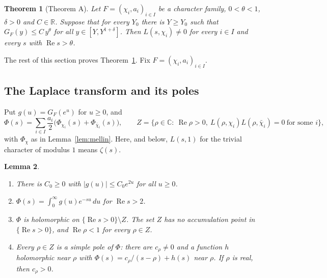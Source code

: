 \documentclass[11pt]{amsart}
\newcommand{\CC}{\mathbb{C}}
\newcommand{\R}{\mathbb{R}}
\newcommand{\re}{\operatorname{Re}}
\theoremstyle{plain}
\newtheorem{theorem}{Theorem}[section]
\newtheorem{lemma}[theorem]{Lemma}
\theoremstyle{definition}
\numberwithin{equation}{section}
\begin{document}
\begin{theorem}[Theorem A]\label{thm:A}
Let $F=(\chi_i,a_i)_{i\in I}$ be a character family, $0<\theta<1$, $\delta>0$ and $C\in\R$.
Suppose that for every $Y_0$ there is $Y\ge Y_0$ such that $G_F(y)\le C\,y^{\theta}$ for all
$y\in[Y,Y^{1+\delta}]$. Then $L(s,\chi_i)\neq0$ for every $i\in I$ and every $s$ with $\re s>\theta$.
\end{theorem}

The rest of this section proves Theorem~\ref{thm:A}. Fix $F=(\chi_i,a_i)_{i\in I}$.

\subsection{The Laplace transform and its poles}

Put $g(u)=G_F(e^{u})$ for $u\ge0$, and
\[
\Phi(s)=\sum_{i\in I}\frac{a_i}{2}\bigl(\Phi_{\chi_i}(s)+\Phi_{\bar\chi_i}(s)\bigr),\qquad
Z=\bigl\{\rho\in\CC:\ \re\rho>0,\ L(\rho,\chi_i)L(\rho,\bar\chi_i)=0\ \text{for some } i\bigr\},
\]
with $\Phi_\chi$ as in Lemma~\ref{lem:mellin}. Here, and below, $L(s,1)$ for the trivial
character of modulus $1$ means $\zeta(s)$.

\begin{lemma}\label{lem:poledata}
\begin{enumerate}[label=(\alph*)]
\item There is $C_0\ge0$ with $|g(u)|\le C_0e^{2u}$ for all $u\ge0$.
\item $\Phi(s)=\int_0^\infty g(u)e^{-su}\,du$ for $\re s>2$.
\item $\Phi$ is holomorphic on $\{\re s>0\}\setminus Z$. The set $Z$ has no accumulation point in
  $\{\re s>0\}$, and $\re\rho<1$ for every $\rho\in Z$.
\item Every $\rho\in Z$ is a simple pole of $\Phi$: there are $c_\rho\neq0$ and a function $h$
  holomorphic near $\rho$ with $\Phi(s)=c_\rho/(s-\rho)+h(s)$ near $\rho$. If $\rho$ is real, then
  $c_\rho>0$.
\end{enumerate}
\end{lemma}
\end{document}
